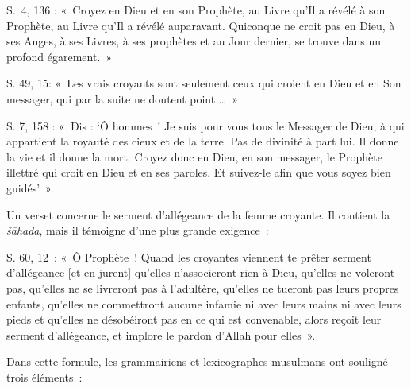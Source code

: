 S.~4, 136 : «~Croyez en Dieu et en son Prophète, au Livre qu'Il a révélé
à son Prophète, au Livre qu'Il a révélé auparavant. Quiconque ne croit
pas en Dieu, à ses Anges, à ses Livres, à ses prophètes et au Jour
dernier, se trouve dans un profond égarement.~»

S. 49, 15: «~Les vrais croyants sont seulement ceux qui croient en Dieu
et en Son messager, qui par la suite ne doutent point \ldots~»

S. 7, 158 : «~Dis : `Ô hommes~! Je suis pour vous tous le Messager de
Dieu, à qui appartient la royauté des cieux et de la terre. Pas de
divinité à part lui. Il donne la vie et il donne la mort. Croyez donc en
Dieu, en son messager, le Prophète illettré qui croit en Dieu et en ses
paroles. Et suivez-le afin que vous soyez bien guidés'~».

Un verset concerne le serment d'allégeance de la femme croyante. Il
contient la \emph{šāhada}, mais il témoigne d'une plus grande exigence~:

S. 60, 12~: «~Ô Prophète~! Quand les croyantes viennent te prêter
serment d'allégeance {[}et en jurent{]} qu'elles n'associeront rien à
Dieu, qu'elles ne voleront pas, qu'elles ne se livreront pas à
l'adultère, qu'elles ne tueront pas leurs propres enfants, qu'elles ne
commettront aucune infamie ni avec leurs mains ni avec leurs pieds et
qu'elles ne désobéiront pas en ce qui est convenable, alors reçoit leur
serment d'allégeance, et implore le pardon d'Allah pour elles~».


Dans cette formule, les grammairiens et lexicographes musulmans ont
souligné trois éléments~:


